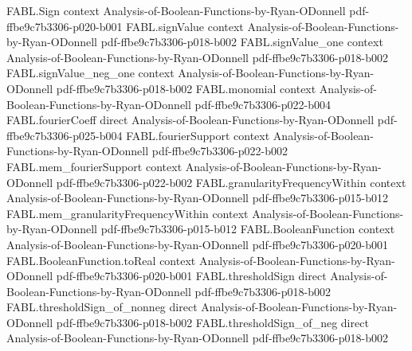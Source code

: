 \begin{theorem}
\label{FABL.totalInfluence_toReal_eq_expect_sensitivity}
\leanok
{}
\proofstep
  {FABL.Sign}
  {context}
  {Analysis-of-Boolean-Functions-by-Ryan-ODonnell}
  {pdf-ffbe9c7b3306-p020-b001}
\proofstep
  {FABL.signValue}
  {context}
  {Analysis-of-Boolean-Functions-by-Ryan-ODonnell}
  {pdf-ffbe9c7b3306-p018-b002}
\proofstep
  {FABL.signValue_one}
  {context}
  {Analysis-of-Boolean-Functions-by-Ryan-ODonnell}
  {pdf-ffbe9c7b3306-p018-b002}
\proofstep
  {FABL.signValue_neg_one}
  {context}
  {Analysis-of-Boolean-Functions-by-Ryan-ODonnell}
  {pdf-ffbe9c7b3306-p018-b002}
\proofstep
  {FABL.monomial}
  {context}
  {Analysis-of-Boolean-Functions-by-Ryan-ODonnell}
  {pdf-ffbe9c7b3306-p022-b004}
\proofstep
  {FABL.fourierCoeff}
  {direct}
  {Analysis-of-Boolean-Functions-by-Ryan-ODonnell}
  {pdf-ffbe9c7b3306-p025-b004}
\proofstep
  {FABL.fourierSupport}
  {context}
  {Analysis-of-Boolean-Functions-by-Ryan-ODonnell}
  {pdf-ffbe9c7b3306-p022-b002}
\proofstep
  {FABL.mem_fourierSupport}
  {context}
  {Analysis-of-Boolean-Functions-by-Ryan-ODonnell}
  {pdf-ffbe9c7b3306-p022-b002}
\proofstep
  {FABL.granularityFrequencyWithin}
  {context}
  {Analysis-of-Boolean-Functions-by-Ryan-ODonnell}
  {pdf-ffbe9c7b3306-p015-b012}
\proofstep
  {FABL.mem_granularityFrequencyWithin}
  {context}
  {Analysis-of-Boolean-Functions-by-Ryan-ODonnell}
  {pdf-ffbe9c7b3306-p015-b012}
\proofstep
  {FABL.BooleanFunction}
  {context}
  {Analysis-of-Boolean-Functions-by-Ryan-ODonnell}
  {pdf-ffbe9c7b3306-p020-b001}
\proofstep
  {FABL.BooleanFunction.toReal}
  {context}
  {Analysis-of-Boolean-Functions-by-Ryan-ODonnell}
  {pdf-ffbe9c7b3306-p020-b001}
\proofstep
  {FABL.thresholdSign}
  {direct}
  {Analysis-of-Boolean-Functions-by-Ryan-ODonnell}
  {pdf-ffbe9c7b3306-p018-b002}
\proofstep
  {FABL.thresholdSign_of_nonneg}
  {direct}
  {Analysis-of-Boolean-Functions-by-Ryan-ODonnell}
  {pdf-ffbe9c7b3306-p018-b002}
\proofstep
  {FABL.thresholdSign_of_neg}
  {direct}
  {Analysis-of-Boolean-Functions-by-Ryan-ODonnell}
  {pdf-ffbe9c7b3306-p018-b002}

\end{theorem}
